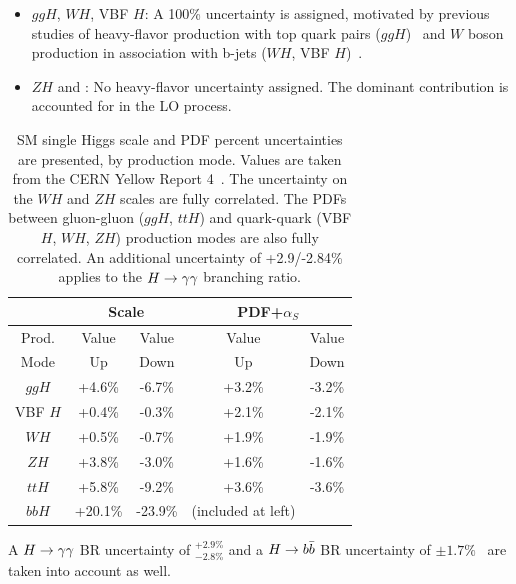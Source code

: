 \begin{itemize}
  \item $ggH$, $WH$, VBF $H$: A 100\% uncertainty is assigned, motivated by previous studies of heavy-flavor production with top quark pairs ($ggH$)~\cite{heavy-flavor-top}  and $W$ boson production in association with b-jets ($WH$, VBF $H$)~\cite{heavy-flavor-W}.
  \item $ZH$ and \tth: No heavy-flavor uncertainty assigned. The dominant contribution is accounted for in the \gls{LO} process.
\end{itemize}

\begin{table}[!htb]
  \begin{center}
    \caption[Theoretical Uncertainties for SM Single Higgs]{
      SM single Higgs scale and PDF percent uncertainties are presented, by production mode. Values are taken from the CERN Yellow Report 4~\cite{yellow-report}. The uncertainty on the $WH$ and $ZH$ scales are fully correlated. The PDFs between gluon-gluon ($ggH$, $ttH$) and quark-quark (VBF $H$, $WH$, $ZH$) production modes are also fully correlated. An additional uncertainty of +2.9/-2.84\% applies to the $H \rightarrow \gamma\gamma$ branching ratio.}
    \begin{tabular}{c|cc|cc}
      \hline
      & \multicolumn{2}{c|}{Scale} & \multicolumn{2}{c}{PDF+$\alpha_S$} \\  \hline
      Prod. &  Value  & Value     &  Value & Value      \\
      Mode  &   Up   & Down &   Up      &Down  \\ \hline
      $ggH$  &  +4.6\%  & -6.7\%      &  +3.2\% & -3.2\%   \\
      VBF $H$  &  +0.4\%  & -0.3\%      &  +2.1\% & -2.1\%       \\
      $WH$   &  +0.5\%  & -0.7\%         &  +1.9\% & -1.9\%    \\
      $ZH$   &  +3.8\%  & -3.0\%         &  +1.6\% & -1.6\%       \\
      $ttH$  &  +5.8\%  & -9.2\%      &  +3.6\% & -3.6\%       \\
      $bbH$  &  +20.1\%  & -23.9\%      & (included at left)       \\
      \hline
    \end{tabular}
    \label{tab:syst-th}
  \end{center}
\end{table}


A $H\rightarrow \gamma\gamma$ \gls{BR} uncertainty of $^{+2.9\%}_{-2.8\%}$ and a $H\rightarrow b\bar{b}$ \gls{BR} uncertainty of $\pm1.7\%$~\cite{hh-crosssections} are taken into account as well.

